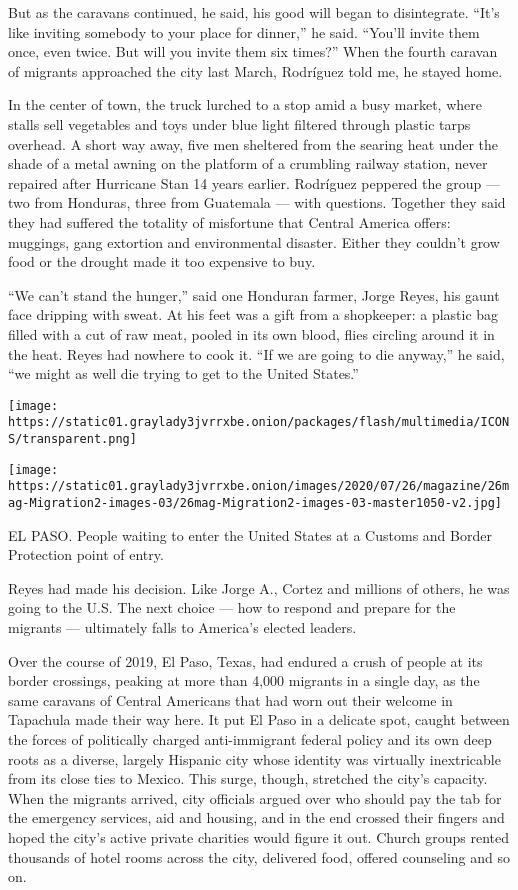 But as the caravans continued, he said, his good will began to
disintegrate. ``It's like inviting somebody to your place for dinner,''
he said. ``You'll invite them once, even twice. But will you invite them
six times?'' When the fourth caravan of migrants approached the city
last March, Rodríguez told me, he stayed home.

In the center of town, the truck lurched to a stop amid a busy market,
where stalls sell vegetables and toys under blue light filtered through
plastic tarps overhead. A short way away, five men sheltered from the
searing heat under the shade of a metal awning on the platform of a
crumbling railway station, never repaired after Hurricane Stan 14 years
earlier. Rodríguez peppered the group --- two from Honduras, three from
Guatemala --- with questions. Together they said they had suffered the
totality of misfortune that Central America offers: muggings, gang
extortion and environmental disaster. Either they couldn't grow food or
the drought made it too expensive to buy.

``We can't stand the hunger,'' said one Honduran farmer, Jorge Reyes,
his gaunt face dripping with sweat. At his feet was a gift from a
shopkeeper: a plastic bag filled with a cut of raw meat, pooled in its
own blood, flies circling around it in the heat. Reyes had nowhere to
cook it. ``If we are going to die anyway,'' he said, ``we might as well
die trying to get to the United States.''

\texttt{[image: https://static01.graylady3jvrrxbe.onion/packages/flash/multimedia/ICONS/transparent.png]}

\texttt{[image: https://static01.graylady3jvrrxbe.onion/images/2020/07/26/magazine/26mag-Migration2-images-03/26mag-Migration2-images-03-master1050-v2.jpg]}

EL PASO. People waiting to enter the United States at a Customs and
Border Protection point of entry.

Reyes had made his decision. Like Jorge A., Cortez and millions of
others, he was going to the U.S. The next choice --- how to respond and
prepare for the migrants --- ultimately falls to America's elected
leaders.

Over the course of 2019, El Paso, Texas, had endured a crush of people
at its border crossings, peaking at more than 4,000 migrants in a single
day, as the same caravans of Central Americans that had worn out their
welcome in Tapachula made their way here. It put El Paso in a delicate
spot, caught between the forces of politically charged anti-immigrant
federal policy and its own deep roots as a diverse, largely Hispanic
city whose identity was virtually inextricable from its close ties to
Mexico. This surge, though, stretched the city's capacity. When the
migrants arrived, city officials argued over who should pay the tab for
the emergency services, aid and housing, and in the end crossed their
fingers and hoped the city's active private charities would figure it
out. Church groups rented thousands of hotel rooms across the city,
delivered food, offered counseling and so on.

